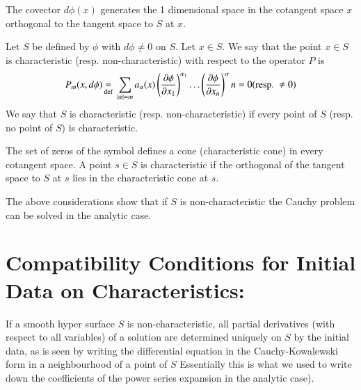 \begin{remark*}
The covector $d\phi(x)$ generates the 1 dimensional space in the cotangent space $x$ orthogonal to the tangent space to $S$ at $x$.
\end{remark*}

\begin{defi*}
Let $S$ be defined by $\phi$ with $d\phi\neq 0$ on $S$. Let $x\in S$. We say that the point $x\in S$ is characteristic (resp. non-characteristic) with respect to the operator $P$ is
$$
P_{m}(x,d\phi)\,{\displaystyle{\mathop{=}_{\text{\rm def}}}}\;\sum\limits_{|\alpha|=m}a_{\alpha}(x)\left(\dfrac{\partial \phi}{\partial x_{1}}\right)^{\alpha_{1}}\ldots \left(\dfrac{\partial \phi}{\partial x_{n}}\right)^{\alpha}n=0(\text{resp.}~ \neq 0)
$$
We say that $S$ is characteristic (resp. non-characteristic) if every point of $S$ (resp. no point of $S$) is characteristic.
\end{defi*}

\begin{remark*}
The set of zeros of the symbol defines a cone (characteristic cone) in every cotangent space. A point $s\in S$ is characteristic if the orthogonal of the tangent space to $S$ at $s$ lies in the characteristic cone at $s$.
\end{remark*}

The above considerations show that if $S$ is non-characteristic the Cauchy problem can be solved in the analytic case.

\section*{Compatibility Conditions for Initial Data on Characteristics:}\pageoriginale

If a smooth hyper surface $S$ is non-characteristic, all partial derivatives (with respect to all variables) of a solution are determined uniquely on $S$ by the initial data, as is seen by writing the differential equation in the Cauchy-Kowalewski form in a neighbourhood of a point of $S$ Essentially this is what we used to write down the coefficients of the power series expansion in the analytic case).

